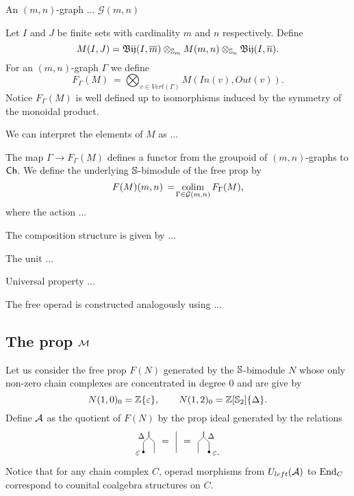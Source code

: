 An $(m, n)$-graph ... $\mathcal G(m, n)$

Let $I$ and $J$ be finite sets with cardinality $m$ and $n$ respectively.
Define
\begin{equation*}
M(I, J) = \Bij(I, \overline m) \otimes_{\S_m} M(m, n) \otimes_{\S_n} \Bij(I, \overline n).
\end{equation*}
For an $(m, n)$-graph $\Gamma$ we define
\begin{equation*}
F_\Gamma(M)\ =\!\!\! \bigotimes_{v \in Vert(\Gamma)}M(In(v), Out(v)).
\end{equation*}
Notice $F_\Gamma(M)$ is well defined up to isomorphisms induced by the symmetry of the monoidal product.

We can interpret the elements of $M$ as ...

The map $\Gamma \to F_\Gamma(M)$ defines a functor from the groupoid of $(m,n)$-graphs to $\Ch$. We define the underlying $\S$-bimodule of the free prop by
\begin{equation*}
F(M)(m, n)\, =\! \colim_{\Gamma \in \mathcal G(m, n)} F_\Gamma(M),
\end{equation*}
where the action ...

The composition structure is given by ...

The unit ...

Universal property ...

The free operad is constructed analogously using ...

\subsection{The prop $\M$}
\label{ss:the prop M}
Let us consider the free prop $F(N)$ generated by the $\S$-bimodule $N$ whose only non-zero chain complexes are concentrated in degree $0$ and are give by
\begin{equation*}
N(1, 0)_0 = \Z\{\varepsilon\}, \qquad
N(1, 2)_0 = \Z[\S_2]\{\Delta\}.
\end{equation*}
Define $\A$ as the quotient of $F(N)$ by the prop ideal generated by the relations
\begin{equation*}
\begin{tikzpicture}[scale=.2]
\draw (-4,0)--(-4,2)--(-5,3)--(-5,4);
\draw (-6,0)--(-6,2)--(-5,3)--(-5,4);
\node [left, scale=.8] at (-5.3,3.2) {$\Delta$};
\draw [fill] (-6,.2) circle [radius=.2];
\node [left] at (-6,0) {$\varepsilon$};

\node at (-2,2) {=};
\draw (0,0)--(0,4);
\node at (2,2) {=};

\draw (4,0)--(4,2)--(5,3)--(5,4);
\draw (6,0)--(6,2)--(5,3)--(5,4);
\node [right, scale=.8] at (5.3,3.2) {$\Delta$};
\draw [fill] (6,.2) circle [radius=.2];
\node [right] at (6,0) {$\varepsilon$.};
\end{tikzpicture}
\end{equation*}
Notice that for any chain complex $C$, operad morphisms from $\Uleft(\A)$ to $\End_C$ correspond to counital coalgebra structures on $C$.

